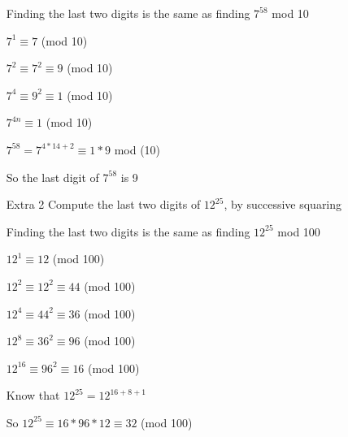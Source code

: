 \documentclass[11pt]{article}
\begin{document}
\begin{itemize}
Finding the last two digits is the same as finding $7^{58}$ mod 10

$7^1 \equiv 7$ (mod 10)

$7^2 \equiv 7^2  \equiv 9$ (mod 10)

$7^4 \equiv 9^2 \equiv 1$ (mod 10)

$7^{4n} \equiv 1$ (mod 10)

$7^{58} = 7^{4*14 + 2} \equiv 1 * 9$ mod (10)

So the last digit of $7^{58}$ is 9

\item[Extra 2]
Compute the last two digits of $12^{25}$, by successive squaring

Finding the last two digits is the same as finding $12^{25}$ mod 100

$12^1 \equiv 12$ (mod 100)

$12^2 \equiv 12^2 \equiv 44$ (mod 100)

$12^4 \equiv 44^2 \equiv 36$ (mod 100)

$12^8 \equiv 36^2 \equiv 96$ (mod 100)

$12^{16} \equiv 96^2 \equiv 16$ (mod 100)


Know that $12^{25} = 12^{16+8+1}$

So $12^{25} \equiv 16 * 96 * 12 \equiv 32$ (mod 100)

\end{itemize}
\end{document}
